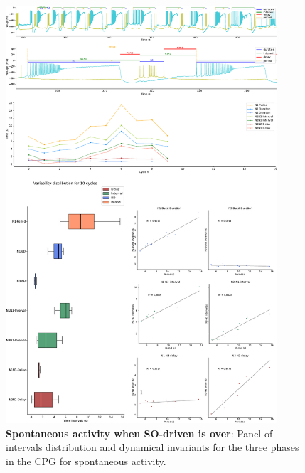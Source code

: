 \begin{figure}[htbp]
	\centering
	\includegraphics[width=0.9\textwidth]{./invariants/data/SUSSEX/prep4_so_no_driven/images/panel_with_intervals.pdf}
	\caption{\textbf{Spontaneous activity when SO-driven is over}: Panel of intervals distribution and dynamical invariants for the three phases in the CPG for spontaneous activity.}
	\label{fig:no so spontaneous invariants}
\end{figure}
 	 
